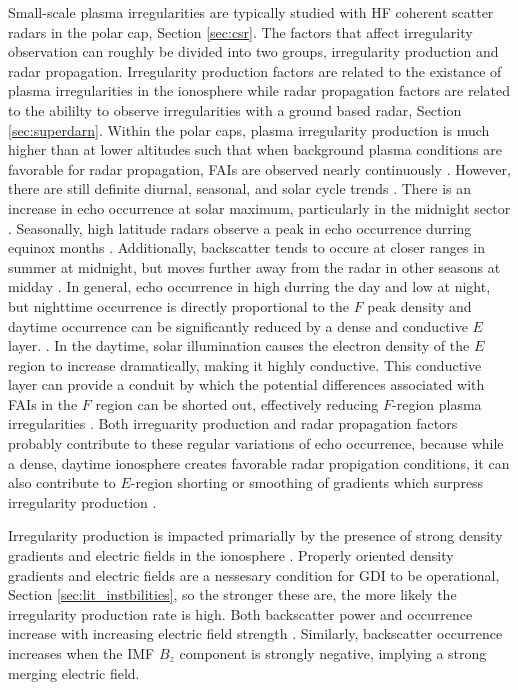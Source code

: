 Small-scale plasma irregularities are typically studied with HF coherent scatter radars in the polar cap, Section \ref{sec:csr}.  The factors that affect irregularity observation can roughly be divided into two groups, irregularity production and radar propagation.  Irregularity production factors are related to the existance of plasma irregularities in the ionosphere while radar propagation factors are related to the abililty to observe irregularities with a ground based radar, Section \ref{sec:superdarn}.  Within the polar caps, plasma irregularity production is much higher than at lower altitudes such that when background plasma conditions are favorable for radar propagation, FAIs are observed nearly continuously \citep{Bristow2011}.  However, there are still definite diurnal, seasonal, and solar cycle trends \citep{Kane2012}.  There is an increase in echo occurrence at solar maximum, particularly in the midnight sector \citep{Milan1997,Koustov2004}.  Seasonally, high latitude radars observe a peak in echo occurrence durring equinox months \citep{Koustov2004}.  Additionally, backscatter tends to occure at closer ranges in summer at midnight, but moves further away from the radar in other seasons at midday \citep{Milan1997}.  In general, echo occurrence in high durring the day and low at night, but nighttime occurrence is directly proportional to the \(F\) peak density and daytime occurrence can be significantly reduced by a dense and conductive \(E\) layer. \citep{Koustov2004,Kane2012,Vickrey1982}.  In the daytime, solar illumination causes the electron density of the \(E\) region to increase dramatically, making it highly conductive.  This conductive layer can provide a conduit by which the potential differences associated with FAIs in the \(F\) region can be shorted out, effectively reducing \(F\)-region plasma irregularities \citep{Vickrey1982}.  Both irreguarity production and radar propagation factors probably contribute to these regular variations of echo occurrence, because while a dense, daytime ionosphere creates favorable radar propigation conditions, it can also contribute to \(E\)-region shorting or smoothing of gradients which surpress irregularity production \citep{Koustov2004}.  

Irregularity production is impacted primarially by the presence of strong density gradients and electric fields in the ionosphere \citep{Koustov2004}.  Properly oriented density gradients and electric fields are a nessesary condition for GDI to be operational, Section \ref{sec:lit_instbilities}, so the stronger these are, the more likely the irregularity production rate is high.  Both backscatter power and occurrence increase with increasing electric field strength \citep{Ballatore2001,Danskin2002,Makarevich2014b}.  Similarly, backscatter occurrence increases when the IMF \(B_z\) component is strongly negative, implying a strong merging electric field.

